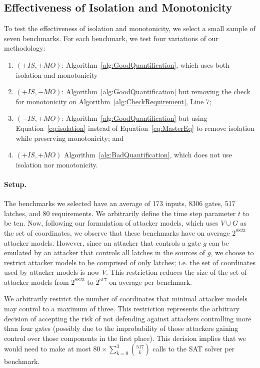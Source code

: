 \subsection{Effectiveness of Isolation and Monotonicity}
To test the effectiveness of isolation and monotonicity, we select a small sample of seven benchmarks. For each benchmark, we test four variations of our methodology: 
\begin{enumerate}
\item{$(+IS, +MO)$}: Algorithm~\ref{alg:GoodQuantification}, which uses both isolation and monotonicity
\item{$(+IS,-MO)$}: Algorithm~\ref{alg:GoodQuantification} but removing the check for monotonicity on Algorithm~\ref{alg:CheckRequirement}, Line 7;
\item{$(-IS,+MO)$}: Algorithm~\ref{alg:GoodQuantification} but using Equation~\ref{eq:isolation} instead of Equation~\ref{eq:MasterEq} to remove isolation while preserving monotonicity; and 
\item{$(+IS,+MO)$} Algorithm~\ref{alg:BadQuantification}, which does not use isolation nor monotonicity. 
\end{enumerate}

\paragraph{Setup.}{The benchmarks we selected have an average of 173 inputs, 8306 gates, 517 latches, and 80 requirements. } We arbitrarily define the time step parameter $t$ to be ten. Now, following our formulation of attacker models, which uses $V\cup G$ as the set of coordinates, we observe that these benchmarks have on average $2^{8823}$ attacker models. %
However, since an attacker that controls a gate $g$ can be emulated by an attacker that controls all latches in the sources of $g$, we choose to restrict attacker models to be comprised of only latches; i.e. the set of coordinates used by attacker models is now $V$. This restriction reduces the size of the set of attacker models from $2^{8823}$ to $2^{517}$ on average per benchmark. 

We arbitrarily restrict the number of coordinates that minimal attacker models may control to a maximum of three. This restriction represents the arbitrary decision of accepting the risk of not defending against attackers controlling more than four gates (possibly due to the improbability of those attackers gaining control over those components in the first place). This decision implies that we would need to make at most $80\times\sum_{k=0}^3 \binom {517}k$ calls to the SAT solver per benchmark. 

